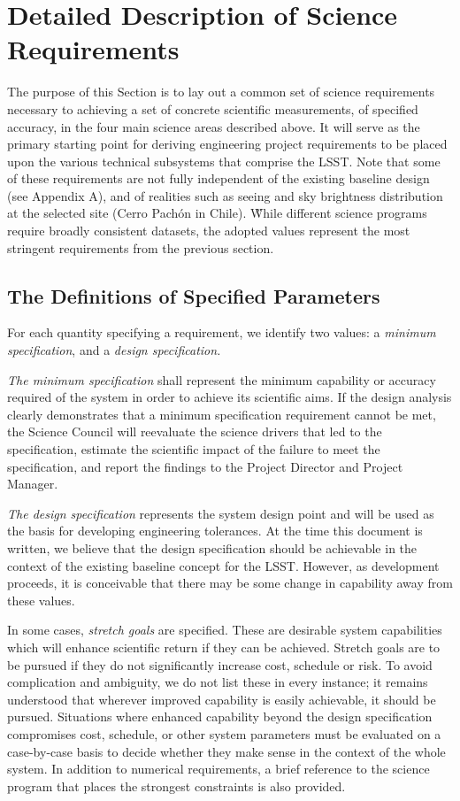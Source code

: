 \newpage
\section{Detailed Description of Science Requirements }

The purpose of this Section is to lay out a common set of science
requirements necessary to achieving a set of concrete scientific measurements,
of specified accuracy, in the four main science areas described above.  It
will serve as the primary starting point for deriving engineering project
requirements to be placed upon the various technical subsystems that
comprise the LSST. Note that some of these requirements are not fully
independent of the existing baseline design (see Appendix A), and of
realities such as seeing and sky brightness distribution at the selected
site (Cerro Pach\'{o}n in Chile). \G{While different science programs
require broadly consistent datasets, the adopted values represent the
most stringent requirements from the previous section.}


\subsection{The Definitions of Specified Parameters }

For each quantity specifying a requirement, we identify two values: a {\it
minimum specification}, and a {\it design specification.}

{\it The minimum specification} shall represent the minimum capability
or accuracy required of the system in order to achieve its scientific
aims. If the design analysis clearly demonstrates that a minimum
specification requirement cannot be met, the Science Council will
reevaluate the science drivers that led to the specification, estimate
the scientific impact of the failure to meet the specification, and
report the findings to the Project Director and Project Manager.

{\it The design specification} represents the system design point and will
be used as the basis for developing engineering tolerances.  At the time
this document is written, we believe that the design specification should
be achievable in the context of the existing baseline concept for the LSST.
However, as development proceeds, it is conceivable that there may be some
change in capability away from these values.

In some cases, {\it stretch goals} are specified. These are desirable
system capabilities which will enhance scientific return if they can be
achieved. Stretch goals are to be pursued if they do not significantly
increase cost, schedule or risk. To avoid complication and ambiguity, we do
not list these in every instance; it remains understood that wherever
improved capability is easily achievable, it should be pursued.  Situations
where enhanced capability beyond the design specification compromises cost,
schedule, or other system parameters must be evaluated on a case-by-case
basis to decide whether they make sense in the context of the whole system.
In addition to numerical requirements, a brief reference to the science
program that places the strongest constraints is also provided.


